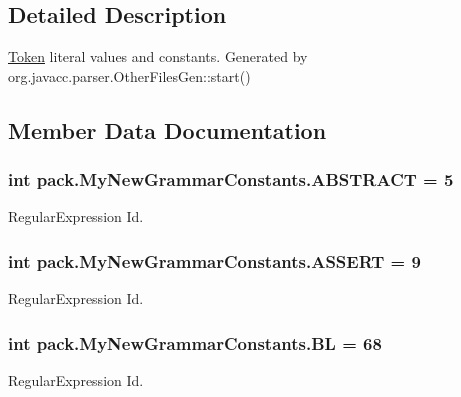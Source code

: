 \subsection{Detailed Description}
\hyperlink{classpack_1_1_token}{Token} literal values and constants. Generated by org.\+javacc.\+parser.\+Other\+Files\+Gen\+::start() 

\subsection{Member Data Documentation}
\subsubsection[{\texorpdfstring{A\+B\+S\+T\+R\+A\+CT}{ABSTRACT}}]{\setlength{\rightskip}{0pt plus 5cm}int pack.\+My\+New\+Grammar\+Constants.\+A\+B\+S\+T\+R\+A\+CT = 5}\hypertarget{interfacepack_1_1_my_new_grammar_constants_a3f2c68de8dbc0764434bde50b58b9011}{}\label{interfacepack_1_1_my_new_grammar_constants_a3f2c68de8dbc0764434bde50b58b9011}
Regular\+Expression Id. 
\subsubsection[{\texorpdfstring{A\+S\+S\+E\+RT}{ASSERT}}]{\setlength{\rightskip}{0pt plus 5cm}int pack.\+My\+New\+Grammar\+Constants.\+A\+S\+S\+E\+RT = 9}\hypertarget{interfacepack_1_1_my_new_grammar_constants_aae907714d085746c35a509af9d83f7f7}{}\label{interfacepack_1_1_my_new_grammar_constants_aae907714d085746c35a509af9d83f7f7}
Regular\+Expression Id. 
\subsubsection[{\texorpdfstring{BL}{BL}}]{\setlength{\rightskip}{0pt plus 5cm}int pack.\+My\+New\+Grammar\+Constants.\+BL = 68}\hypertarget{interfacepack_1_1_my_new_grammar_constants_addd8691253a476774512dfd2b70aff6b}{}\label{interfacepack_1_1_my_new_grammar_constants_addd8691253a476774512dfd2b70aff6b}
Regular\+Expression Id. 
